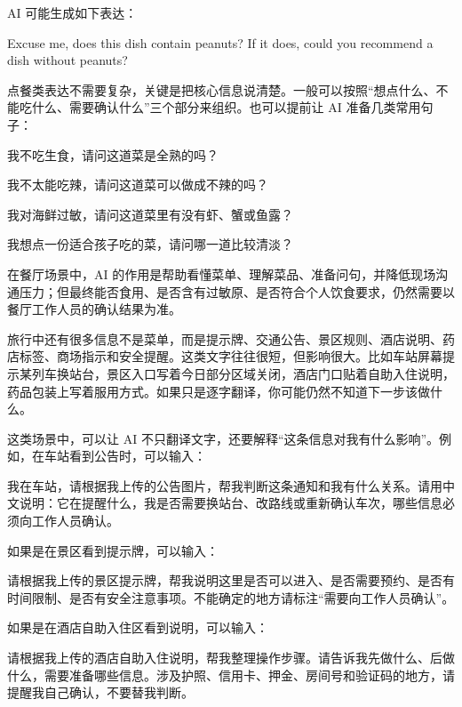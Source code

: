 AI 可能生成如下表达：

\begin{tcolorbox}[promptbox]
Excuse me, does this dish contain peanuts? If it does, could you recommend a dish without peanuts?
\end{tcolorbox}

点餐类表达不需要复杂，关键是把核心信息说清楚。一般可以按照“想点什么、不能吃什么、需要确认什么”三个部分来组织。也可以提前让 AI 准备几类常用句子：

\begin{tcolorbox}[promptbox]
我不吃生食，请问这道菜是全熟的吗？

我不太能吃辣，请问这道菜可以做成不辣的吗？

我对海鲜过敏，请问这道菜里有没有虾、蟹或鱼露？

我想点一份适合孩子吃的菜，请问哪一道比较清淡？
\end{tcolorbox}

在餐厅场景中，AI 的作用是帮助看懂菜单、理解菜品、准备问句，并降低现场沟通压力；但最终能否食用、是否含有过敏原、是否符合个人饮食要求，仍然需要以餐厅工作人员的确认结果为准。


旅行中还有很多信息不是菜单，而是提示牌、交通公告、景区规则、酒店说明、药店标签、商场指示和安全提醒。这类文字往往很短，但影响很大。比如车站屏幕提示某列车换站台，景区入口写着今日部分区域关闭，酒店门口贴着自助入住说明，药品包装上写着服用方式。如果只是逐字翻译，你可能仍然不知道下一步该做什么。

这类场景中，可以让 AI 不只翻译文字，还要解释“这条信息对我有什么影响”。例如，在车站看到公告时，可以输入：

\begin{tcolorbox}[promptbox]
我在车站，请根据我上传的公告图片，帮我判断这条通知和我有什么关系。请用中文说明：它在提醒什么，我是否需要换站台、改路线或重新确认车次，哪些信息必须向工作人员确认。
\end{tcolorbox}

如果是在景区看到提示牌，可以输入：

\begin{tcolorbox}[promptbox]
请根据我上传的景区提示牌，帮我说明这里是否可以进入、是否需要预约、是否有时间限制、是否有安全注意事项。不能确定的地方请标注“需要向工作人员确认”。
\end{tcolorbox}

如果是在酒店自助入住区看到说明，可以输入：

\begin{tcolorbox}[promptbox]
请根据我上传的酒店自助入住说明，帮我整理操作步骤。请告诉我先做什么、后做什么，需要准备哪些信息。涉及护照、信用卡、押金、房间号和验证码的地方，请提醒我自己确认，不要替我判断。
\end{tcolorbox}

